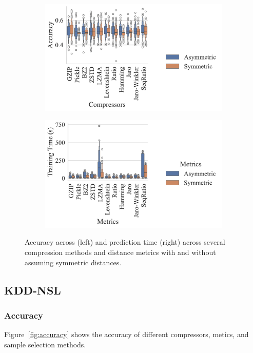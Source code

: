 \begin{figure}
    \begin{subfigure}
        \centering
        \includegraphics[width=.36\textwidth]{figs/truthseeker/symmetric_vs_metric.pdf}
    \end{subfigure}
    \begin{subfigure}
        \centering
        \includegraphics[width=.36\textwidth]{figs/truthseeker/symmetric_vs_metric_train_time.pdf}
    \end{subfigure}
    \caption{Accuracy across (left) and prediction time (right) across several compression methods and distance metrics with and without assuming symmetric distances.}
    \label{fig:symmetry}
\end{figure}


\subsection{KDD-NSL}

\subsubsection{Accuracy}
Figure~\ref{fig:accuracy} shows the accuracy of different compressors, metics, and sample selection methods.

